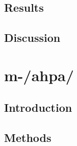\subsection{Results}
\subsection{Discussion}



\section{{\color{red}m-/ahpa/}} \label{3-m-ahpa}
\subsection{Introduction}
\subsection{Methods}
